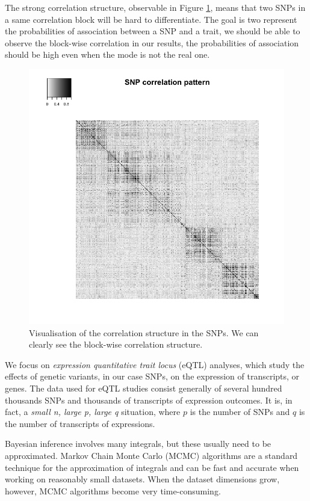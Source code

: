 \documentclass[a4paper, 11pt]{report}
\numberwithin{equation}{chapter}
\begin{document}
The strong correlation structure, observable in Figure \ref{fig:corr}, means that two SNPs in a same correlation block will be hard to differentiate. The goal is two represent the probabilities of association between a SNP and a trait, we should be able to observe the block-wise correlation in our results, the probabilities of association should be high even when the mode is not the real one.

\begin{figure}[h!]
\begin{center}
\includegraphics[width=5in,bb = 0 0 800px 800px]{images/corr_real_SNPs.png}
\caption{\label{fig:corr} Visualisation of the correlation structure in the SNPs. We can clearly see the block-wise correlation structure.}
\end{center}
\end{figure}

We focus on \textit{expression quantitative trait locus} (eQTL) analyses, which study the effects of genetic variants, in our case SNPs, on the expression of transcripts, or genes. The data used for eQTL studies consist generally of several hundred thousands SNPs and thousands of transcripts of expression outcomes. It is, in fact, a \textit{small n, large p, large q} situation, where $p$ is the number of SNPs and $q$ is the number of transcripts of expressions.

Bayesian inference involves many integrals, but these usually need to be approximated. Markov Chain Monte Carlo (MCMC) algorithms are a standard technique for the approximation of integrals and can be fast and accurate when working on reasonably small datasets. When the dataset dimensions grow, however, MCMC algorithms become very time-consuming.
\end{document}
